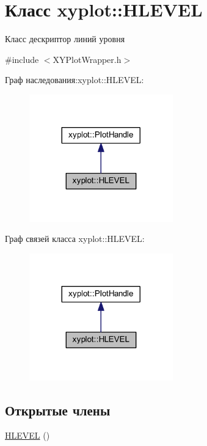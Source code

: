 \hypertarget{classxyplot_1_1_h_l_e_v_e_l}{\section{Класс xyplot\-:\-:H\-L\-E\-V\-E\-L}
\label{classxyplot_1_1_h_l_e_v_e_l}
}


Класс дескриптор линий уровня  




{\ttfamily \#include $<$X\-Y\-Plot\-Wrapper.\-h$>$}



Граф наследования\-:xyplot\-:\-:H\-L\-E\-V\-E\-L\-:\nopagebreak
\begin{figure}[H]
\begin{center}
\leavevmode
\includegraphics[width=176pt]{classxyplot_1_1_h_l_e_v_e_l__inherit__graph}
\end{center}
\end{figure}


Граф связей класса xyplot\-:\-:H\-L\-E\-V\-E\-L\-:\nopagebreak
\begin{figure}[H]
\begin{center}
\leavevmode
\includegraphics[width=176pt]{classxyplot_1_1_h_l_e_v_e_l__coll__graph}
\end{center}
\end{figure}
\subsection*{Открытые члены}
\begin{DoxyCompactItemize}
\item 
\hyperlink{classxyplot_1_1_h_l_e_v_e_l_adb83b057b07112c56e4ce303232c2b86}{H\-L\-E\-V\-E\-L} ()
\end{DoxyCompactItemize}
